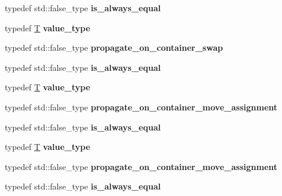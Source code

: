\begin{DoxyCompactItemize}
\item 
\mbox{\label{structsome__alloc3_a8507fb4590dc6d728bf639d9691af063}} 
typedef std\+::false\+\_\+type {\bfseries is\+\_\+always\+\_\+equal}
\item 
\mbox{\label{structsome__alloc3_a859670f2c07ffe08a8b7c4fdc380b21f}} 
typedef \mbox{\hyperlink{struct_t}{T}} {\bfseries value\+\_\+type}
\item 
\mbox{\label{structsome__alloc3_a0ef9538889b4aeddeb81689c107f3455}} 
typedef std\+::false\+\_\+type {\bfseries propagate\+\_\+on\+\_\+container\+\_\+swap}
\item 
\mbox{\label{structsome__alloc3_a8507fb4590dc6d728bf639d9691af063}} 
typedef std\+::false\+\_\+type {\bfseries is\+\_\+always\+\_\+equal}
\item 
\mbox{\label{structsome__alloc3_a859670f2c07ffe08a8b7c4fdc380b21f}} 
typedef \mbox{\hyperlink{struct_t}{T}} {\bfseries value\+\_\+type}
\item 
\mbox{\label{structsome__alloc3_a31083b642ac1a8adf62f4d0b563f3e0e}} 
typedef std\+::false\+\_\+type {\bfseries propagate\+\_\+on\+\_\+container\+\_\+move\+\_\+assignment}
\item 
\mbox{\label{structsome__alloc3_a8507fb4590dc6d728bf639d9691af063}} 
typedef std\+::false\+\_\+type {\bfseries is\+\_\+always\+\_\+equal}
\item 
\mbox{\label{structsome__alloc3_a859670f2c07ffe08a8b7c4fdc380b21f}} 
typedef \mbox{\hyperlink{struct_t}{T}} {\bfseries value\+\_\+type}
\item 
\mbox{\label{structsome__alloc3_a31083b642ac1a8adf62f4d0b563f3e0e}} 
typedef std\+::false\+\_\+type {\bfseries propagate\+\_\+on\+\_\+container\+\_\+move\+\_\+assignment}
\item 
\mbox{\label{structsome__alloc3_a8507fb4590dc6d728bf639d9691af063}} 
typedef std\+::false\+\_\+type {\bfseries is\+\_\+always\+\_\+equal}
\item 

\end{DoxyCompactItemize}
